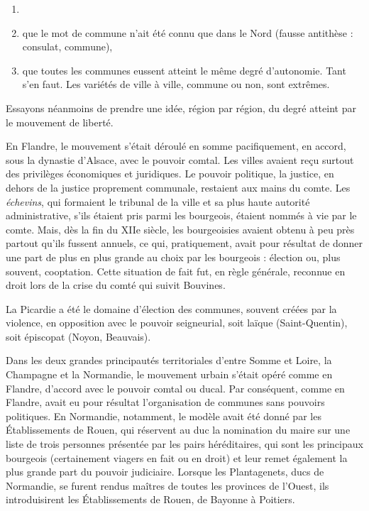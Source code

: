 \documentclass[french,twoside]{book} %
\begin{document}
\begin{enumerate}[itemsep=0pt,]
\item[] \hspace{-1.5em}{\bfseries Mais deux erreurs sont à prévenir :}
\item que le mot de commune n’ait été connu que dans le Nord (fausse antithèse : consulat, commune),
\item que toutes les communes eussent atteint le même degré d’autonomie. Tant s’en faut. Les variétés de ville à ville, commune ou non, sont extrêmes.

\end{enumerate}\noindent Essayons néanmoins de prendre une idée, région par région, du degré atteint par le mouvement de liberté.\par
En Flandre, le mouvement s’était déroulé en somme pacifiquement, en accord, sous la dynastie d’Alsace, avec le pouvoir comtal. Les villes avaient reçu surtout des privilèges économiques et juridiques. Le pouvoir politique, la justice, en dehors de la justice proprement communale, restaient aux mains du comte. Les \emph{échevins}, qui formaient le tribunal de la ville et sa plus haute autorité administrative, s’ils étaient pris parmi les bourgeois, étaient nommés à vie par le comte. Mais, dès la fin du XIIe siècle, les bourgeoisies avaient obtenu à peu près partout qu’ils fussent annuels, ce qui,  
\label{p73} pratiquement, avait pour résultat de donner une part de plus en plus grande au choix par les bourgeois : élection ou, plus souvent, cooptation. Cette situation de fait fut, en règle générale, reconnue en droit lors de la crise du comté qui suivit Bouvines.\par
La Picardie a été le domaine d’élection des communes, souvent créées par la violence, en opposition avec le pouvoir seigneurial, soit laïque (Saint-Quentin), soit épiscopat (Noyon, Beauvais).\par
Dans les deux grandes principautés territoriales d’entre Somme et Loire, la Champagne et la Normandie, le mouvement urbain s’était opéré comme en Flandre, d’accord avec le pouvoir comtal ou ducal. Par conséquent, comme en Flandre, avait eu pour résultat l’organisation de communes sans pouvoirs politiques. En Normandie, notamment, le modèle avait été donné par les Établissements de Rouen, qui réservent au duc la nomination du maire sur une liste de trois personnes présentée par les pairs héréditaires, qui sont les principaux bourgeois (certainement viagers en fait ou en droit) et leur remet également la plus grande part du pouvoir judiciaire. Lorsque les Plantagenets, ducs de Normandie, se furent rendus maîtres de toutes les provinces de l’Ouest, ils introduisirent les Établissements de Rouen, de Bayonne à Poitiers.\par
\end{document}
